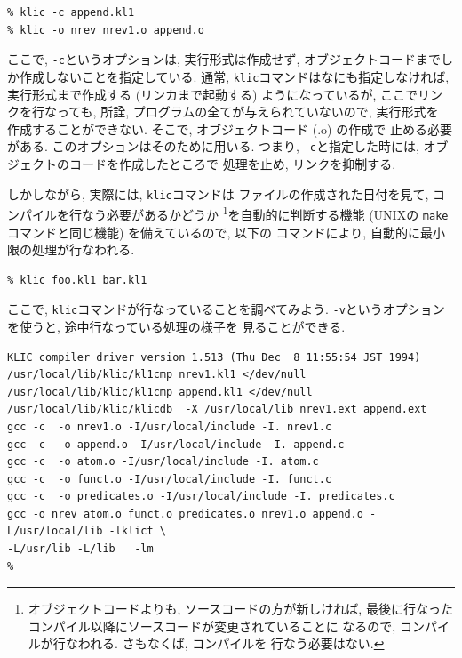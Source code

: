 \documentclass[a4,titlepage]{jsreport}
\begin{document}
\begin{Verbatim}[frame=single,baselinestretch=0.8]
% klic -c nrev1.kl1
% klic -c append.kl1
% klic -o nrev nrev1.o append.o
\end{Verbatim}

ここで, \verb|-c|というオプションは, 実行形式は作成せず, 
オブジェクトコードまでしか作成しないことを指定している.  
通常, \verb|klic|コマンドはなにも指定しなければ, 実行形式まで作成する 
(リンカまで起動する) ようになっているが, ここでリンクを行なっても, 
所詮, プログラムの全てが与えられていないので, 実行形式を
作成することができない.  そこで, オブジェクトコード (.o) の作成で
止める必要がある.  このオプションはそのために用いる.  
つまり, \verb|-c|と指定した時には, オブジェクトのコードを作成したところで
処理を止め, リンクを抑制する.  

しかしながら, 実際には, \verb|klic|コマンドは
ファイルの作成された日付を見て, コンパイルを行なう必要があるかどうか
\footnote{オブジェクトコードよりも, ソースコードの方が新しければ, 
最後に行なったコンパイル以降にソースコードが変更されていることに
なるので, コンパイルが行なわれる.  さもなくば, コンパイルを
行なう必要はない.  }を自動的に判断する機能 (UNIXの {\tt make} 
コマンドと同じ機能) を備えているので, 以下の
コマンドにより, 自動的に最小限の処理が行なわれる.  

\begin{Verbatim}
% klic foo.kl1 bar.kl1
\end{Verbatim}

ここで, \verb|klic|コマンドが行なっていることを調べてみよう.  
\verb|-v|というオプションを使うと, 途中行なっている処理の様子を
見ることができる.  

\begin{Verbatim}[frame=single,baselinestretch=0.8]
%klic -o nrev -v nrev1.kl1 append.kl1
KLIC compiler driver version 1.513 (Thu Dec  8 11:55:54 JST 1994)
/usr/local/lib/klic/kl1cmp nrev1.kl1 </dev/null
/usr/local/lib/klic/kl1cmp append.kl1 </dev/null
/usr/local/lib/klic/klicdb  -X /usr/local/lib nrev1.ext append.ext
gcc -c  -o nrev1.o -I/usr/local/include -I. nrev1.c
gcc -c  -o append.o -I/usr/local/include -I. append.c
gcc -c  -o atom.o -I/usr/local/include -I. atom.c
gcc -c  -o funct.o -I/usr/local/include -I. funct.c
gcc -c  -o predicates.o -I/usr/local/include -I. predicates.c
gcc -o nrev atom.o funct.o predicates.o nrev1.o append.o -L/usr/local/lib -lklict \
-L/usr/lib -L/lib   -lm
%
\end{Verbatim}
\end{document}
